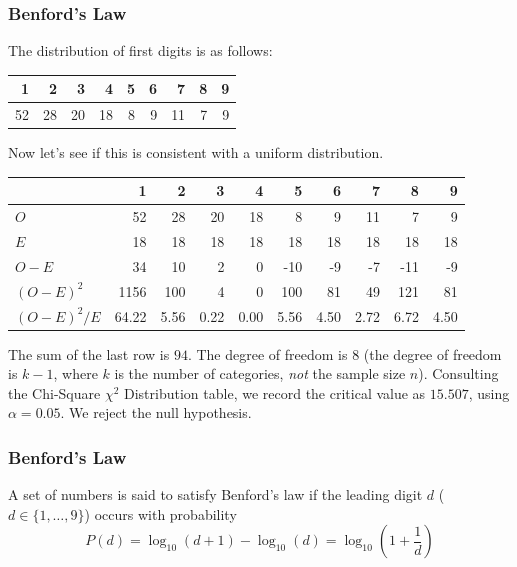 \documentclass[xcolor=dvipsnames]{beamer}
\begin{document}
\begin{frame}
  \frametitle{Benford's Law}
  The distribution of first digits is as follows:
  \begin{tabular}{|r|r|r|r|r|r|r|r|r|}\hline
   1 & 2 & 3 & 4 & 5 & 6 &  7 & 8 & 9 \\ \hline
   52 & 28 & 20 & 18 & 8 & 9 & 11 & 7 &  9 \\ \hline
  \end{tabular}

\bigskip

  Now let's see if this is consistent with a uniform distribution.

\bigskip

\begin{footnotesize}
  \begin{tabular}{|l|r|r|r|r|r|r|r|r|r|}\hline
                 & 1    & 2    & 3    & 4    & 5     & 6     & 7     & 8     & 9     \\ \hline
   $O$           & 52   & 28   & 20   & 18   & 8     & 9     & 11    & 7     & 9     \\ \hline
   $E$           & 18   & 18   & 18   & 18   & 18    & 18    & 18    & 18    & 18    \\ \hline
   $O-E$         & 34   & 10   & 2    & 0    & -10   & -9    & -7    & -11   & -9    \\ \hline
   $(O-E)^{2}$   & 1156 & 100  & 4    & 0    & 100   & 81    & 49    & 121   & 81    \\ \hline
   $(O-E)^{2}/E$ & 64.22 & 5.56 & 0.22 & 0.00 & 5.56 & 4.50 & 2.72 & 6.72 & 4.50 \\ \hline
  \end{tabular}
\end{footnotesize}

\bigskip

The sum of the last row is $94$. The degree of freedom is $8$ (the
degree of freedom is $k-1$, where $k$ is the number of categories,
\emph{not} the sample size $n$). Consulting the Chi-Square
$\chi^{2}$ Distribution table, we record the critical value as
$15.507$, using $\alpha=0.05$. We reject the null hypothesis.
\end{frame}

\begin{frame}
  \frametitle{Benford's Law}
  A set of numbers is said to satisfy Benford's law if the leading digit $d$ ($d\in\{1,{\ldots},9\}$) occurs with probability
  \begin{equation}
    \label{eq:aihuwoob}
    P(d)=\log_{10}(d+1)-\log_{10}(d)=\log_{10}\left(1+\frac{1}{d}\right)
  \end{equation}
\end{frame}
\end{document}
